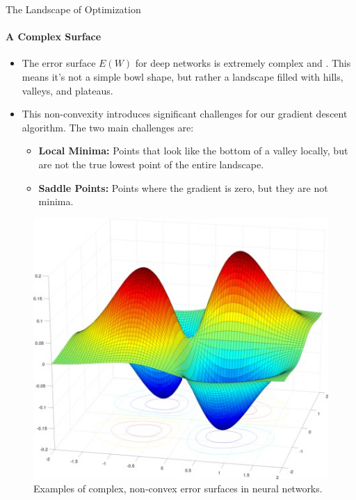 \begin{frame}{The Landscape of Optimization}
    \framesubtitle{A Complex Surface}
    \small
    \begin{itemize}
        \item The error surface $E(W)$ for deep networks is extremely complex and . This means it's not a simple bowl shape, but rather a landscape filled with hills, valleys, and plateaus.
        \item This non-convexity introduces significant challenges for our gradient descent algorithm. The two main challenges are:
        \begin{itemize}
            \item \textbf{Local Minima:} Points that look like the bottom of a valley locally, but are not the true lowest point of the entire landscape.
            \item \textbf{Saddle Points:} Points where the gradient is zero, but they are not minima.
        \end{itemize}
    \end{itemize}
    \begin{figure}
        \centering
        \includegraphics[width=0.3\linewidth]{images/error_surfaces.png}
        \caption{Examples of complex, non-convex error surfaces in neural networks.}
    \end{figure}
\end{frame}

